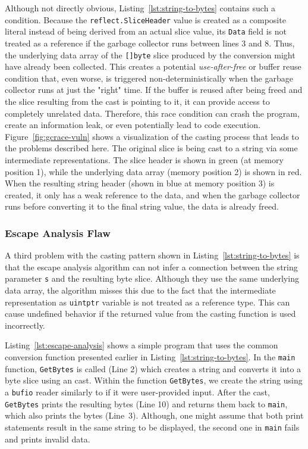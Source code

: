 Although not directly obvious, Listing~\ref{lst:string-to-bytes} contains such a condition.
Because the \texttt{reflect.SliceHeader} value is created as a composite literal instead of being derived from an actual slice value, its \texttt{Data} field is not treated as a reference if the garbage collector runs between lines 3 and 8. 
Thus, the underlying data array of the \texttt{[]byte} slice produced by the conversion might have already been collected.
This creates a potential \textit{use-after-free} or buffer reuse condition that, even worse, is triggered non-deterministically when the garbage collector runs at just the "right" time.
If the buffer is reused after being freed and the slice resulting from the cast is pointing to it, it can provide access to completely unrelated data. %
Therefore, this race condition can crash the program, create an information leak, or even potentially lead to code execution.
Figure~\ref{fig:gcrace-vuln} shows a visualization of the casting process that leads to the problems described here.
The original slice is being cast to a string via some intermediate representations.
The slice header is shown in green (at memory position 1), while the underlying data array (memory position 2) is shown in red.
When the resulting string header (shown in blue at memory position 3) is created, it only has a weak reference to the data, and when the garbage collector runs before converting it to the final string value, the data is already freed.




\subsubsection*{Escape Analysis Flaw}

A third problem with the casting pattern shown in Listing~\ref{lst:string-to-bytes} is that the escape analysis algorithm can not infer a connection between the string parameter \texttt{s} and the resulting byte slice.
Although they use the same underlying data array, the algorithm misses this due to the fact that the intermediate representation as \texttt{uintptr} variable is not treated as a reference type.
This can cause undefined behavior if the returned value from the casting function is used incorrectly.

Listing~\ref{lst:escape-analysis} shows a simple program that uses the common conversion function presented earlier in Listing~\ref{lst:string-to-bytes}.
In the \texttt{main} function, \texttt{GetBytes} is called (Line 2) which creates a string and converts it into a byte slice using an \unsafe{} cast.
Within the function \texttt{GetBytes}, we create the string using a \texttt{bufio} reader similarly to if it were user-provided input.
After the cast, \texttt{GetBytes} prints the resulting bytes (Line 10) and returns them back to \texttt{main}, which also prints the bytes (Line~3).
Although, one might assume that both print statements result in the same string to be displayed, the second one in \texttt{main} fails and prints invalid data.


